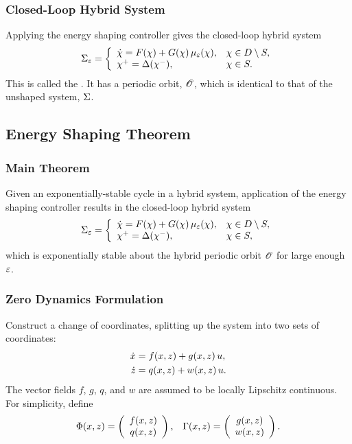 \begin{frame}
  \frametitle{Closed-Loop Hybrid System}
  Applying the energy shaping controller gives the closed-loop hybrid system
  \begin{align*}
    \Sigma_{\varepsilon} = \left\{
      \begin{array}{l l}
        {\dot {\chi}} = F(\chi) + G(\chi) \, \mu_{\varepsilon}(\chi), & \chi \in D \setminus S,\\
        \chi^{+} = \Delta(\chi^{-}), & \chi \in S.
      \end{array}\right.
  \end{align*}
  This is called the . It has a periodic orbit, $\mathscr O$,
  which is identical to that of the unshaped system, $\Sigma$.
\end{frame}

\subsection{Energy Shaping Theorem}

\begin{frame}
  \frametitle{Main Theorem}

  \begin{theorem}
    Given an exponentially-stable cycle in a hybrid system, application
    of the energy shaping controller results in the closed-loop hybrid system
    \begin{align*}
      \Sigma_{\varepsilon} = \left\{
      \begin{array}{l l}
        {\dot {\chi}} = F(\chi) + G(\chi) \, \mu_{\varepsilon}(\chi), & \chi \in D \setminus S,\\
        \chi^{+} = \Delta(\chi^{-}), & \chi \in S,
      \end{array}\right.
  \end{align*}
  which is exponentially stable about the hybrid periodic orbit $\mathscr O$ for
  large enough $\varepsilon$.
  
  \end{theorem}
\end{frame}

\begin{frame}
  \frametitle{Zero Dynamics Formulation}
  Construct a change of coordinates, splitting up the system into two sets of coordinates:
  \begin{align*}
    \dot {x} &= f(x, z) + g(x, z) \, u,\\
    \dot {z} &= q(x, z) + w(x, z) \, u.
  \end{align*}
  The vector fields $f$, $g$, $q$, and $w$ are assumed to be locally Lipschitz
  continuous. For simplicity, define
  \begin{align*}
    \Phi(x, z) = \left(\begin{array}{c}
        f(x, z)\\
        q(x, z)
      \end{array}\right),&&
    \Gamma (x, z) = \left(\begin{array}{c}
        g(x, z)\\
        w(x, z)
      \end{array}\right).
  \end{align*}
\end{frame}

